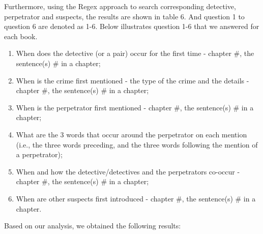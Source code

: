 \documentclass{article}
\begin{document}
Furthermore, using the Regex approach to search corresponding detective, perpetrator and suspects, the results are shown in table 6. And question 1 to question 6 are denoted as 1-6. Below illustrates question 1-6 that we answered for each book.
\begin{enumerate}
\item When does the detective (or a pair) occur for the first time - chapter \#, the sentence(s) \# in a chapter;
\item When is the crime first mentioned - the type of the crime and the details - chapter \#, the sentence(s) \# in a chapter;
\item When is the perpetrator first mentioned - chapter \#, the sentence(s) \# in a chapter;
\item What are the 3 words that occur around the perpetrator on each mention (i.e., the three words preceding, and the three words following the mention of a perpetrator);
\item When and how the detective/detectives and the perpetrators co-occur - chapter \#, the sentence(s) \# in a chapter;
\item When are other suspects first introduced - chapter \#, the sentence(s) \# in a chapter.
\end{enumerate}

Based on our analysis, we obtained the following results: \\
\\
\end{document}
